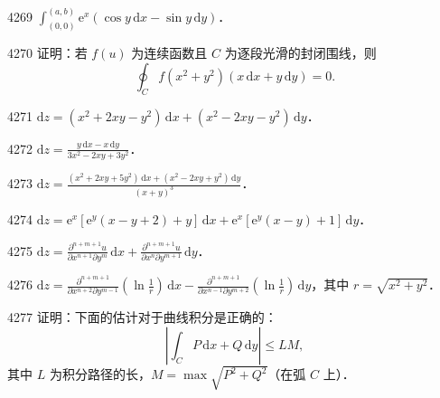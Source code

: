 \begin{prob}[S]{4269}
$\displaystyle\int_{(0,0)}^{(a,b)} \mathrm{e}^x(\cos y\,\mathrm{d}x - \sin y\,\mathrm{d}y)$．
\end{prob}

\begin{prob}[M]{4270}
证明：若 $f(u)$ 为连续函数且 $C$ 为逐段光滑的封闭围线，则
\[
\oint_C f(x^2+y^2)(x\,\mathrm{d}x + y\,\mathrm{d}y) = 0.
\]
\end{prob}


\begin{prob}[S]{4271}
$\mathrm{d}z = (x^2 + 2xy - y^2)\,\mathrm{d}x + (x^2 - 2xy - y^2)\,\mathrm{d}y$．
\end{prob}

\begin{prob}[S]{4272}
$\mathrm{d}z = \frac{y\,\mathrm{d}x - x\,\mathrm{d}y}{3x^2 - 2xy + 3y^2}$．
\end{prob}

\begin{prob}[S]{4273}
$\mathrm{d}z = \frac{(x^2 + 2xy + 5y^2)\,\mathrm{d}x + (x^2 - 2xy + y^2)\,\mathrm{d}y}{(x+y)^3}$．
\end{prob}

\begin{prob}[S]{4274}
$\mathrm{d}z = \mathrm{e}^x[\mathrm{e}^y(x - y + 2) + y]\,\mathrm{d}x + \mathrm{e}^x[\mathrm{e}^y(x - y) + 1]\,\mathrm{d}y$．
\end{prob}

\begin{prob}[S]{4275}
$\mathrm{d}z = \frac{\partial^{n+m+1}u}{\partial x^{n+1}\partial y^m}\,\mathrm{d}x + \frac{\partial^{n+m+1}u}{\partial x^n\partial y^{m+1}}\,\mathrm{d}y$．
\end{prob}

\begin{prob}[M]{4276}
$\mathrm{d}z = \frac{\partial^{n+m+1}}{\partial x^{n+2}\partial y^{m-1}}\left(\ln\frac{1}{r}\right)\,\mathrm{d}x - \frac{\partial^{n+m+1}}{\partial x^{n-1}\partial y^{m+2}}\left(\ln\frac{1}{r}\right)\,\mathrm{d}y$，其中 $r = \sqrt{x^2+y^2}$．
\end{prob}

\begin{prob}[M]{4277}
证明：下面的估计对于曲线积分是正确的：
\[
\left|\int_C P\,\mathrm{d}x + Q\,\mathrm{d}y\right| \leqslant LM,
\]
其中 $L$ 为积分路径的长，$M = \max \sqrt{P^2+Q^2}$（在弧 $C$ 上）．
\end{prob}


